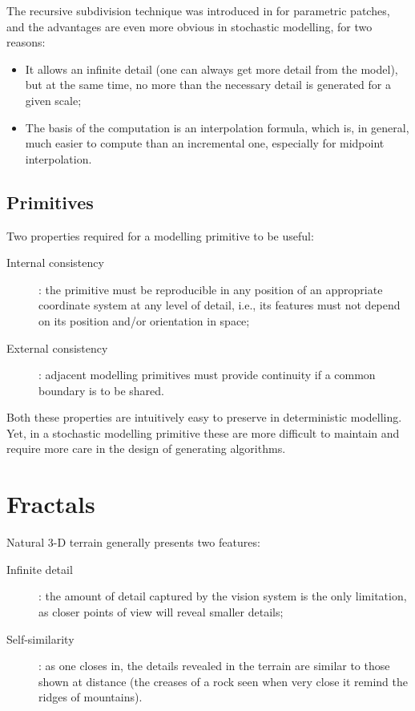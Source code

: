 \documentclass{acmtog}
\begin{document}
The recursive subdivision technique was introduced in \cite{Catmull78} for parametric patches, and the advantages are even more obvious in stochastic modelling, for two reasons:
\begin{itemize}
\item{It allows an infinite detail (one can always get more detail from the model), but at the same time, no more than the necessary detail is generated for a given scale;}
\item{The basis of the computation is an interpolation formula, which is, in general, much easier to compute than an incremental one, especially for midpoint interpolation.}
\end{itemize}

\subsection{Primitives}
Two properties required for a modelling primitive to be useful:
\begin{description}
\item[Internal consistency]{: the primitive must be reproducible in any position of an appropriate coordinate system at any level of detail, i.e., its features must not depend on its position and/or orientation in space;}
\item[External consistency]{: adjacent modelling primitives must provide continuity if a common boundary is to be shared.}
\end{description}

Both these properties are intuitively easy to preserve in deterministic modelling. Yet, in a stochastic modelling primitive these are more difficult to maintain and require more care in the design of generating algorithms.

\section{Fractals}
Natural 3-D terrain generally presents two features:
\begin{description}
\item[Infinite detail]{: the amount of detail captured by the vision system is the only limitation, as closer points of view will reveal smaller details;}
\item[Self-similarity]{: as one closes in, the details revealed in the terrain are similar to those shown at distance (the creases of a rock seen when very close it remind the ridges of mountains).}
\end{description}
\end{document}
